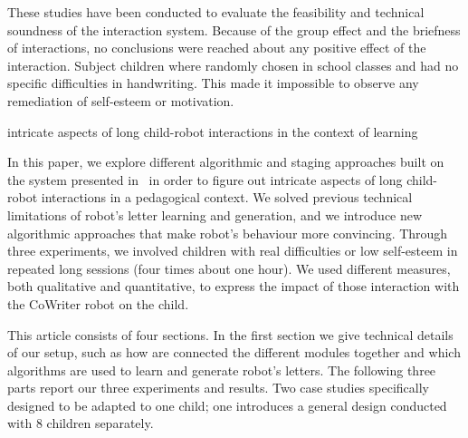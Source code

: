 \documentclass{sig-alternate}
\begin{document}
These studies have been conducted to evaluate the feasibility and technical soundness
of the interaction system. Because of the group effect and the briefness of
interactions, no conclusions were reached about any positive effect of the
interaction. Subject children where randomly chosen in school
classes and had no specific difficulties in handwriting. This made it
impossible to observe any remediation of self-esteem or motivation.

intricate aspects
of long child-robot interactions in the context of learning

In this paper, we explore different algorithmic and staging approaches built on the system presented in~\cite{hood2015when} in order to figure out intricate aspects of long child-robot interactions in a pedagogical context. We solved previous 
technical limitations of robot's letter learning and generation, and we introduce new algorithmic approaches that make robot's behaviour more convincing.
Through three experiments, we involved children with real difficulties or low 
self-esteem in repeated long sessions (four times about one hour). We used different
measures, both qualitative and quantitative, to express the impact of those
interaction with the CoWriter robot on the child.

This article consists of four sections. In the first section we give technical details of our setup, such as how are connected the different modules
together and which algorithms are used to learn and generate robot's letters.
The following three parts report our three experiments and results. Two case studies specifically designed to be adapted to one child; one introduces a general design conducted with 8 children separately. 


%
\end{document}
